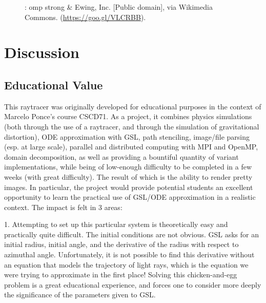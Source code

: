 \begin{figure}[h]
\begin{minipage}{0.45\linewidth}
  \caption{: omp strong \&
    Ewing, Inc. [Public domain], via Wikimedia
    Commons. (\url{https://goo.gl/VLCRBB}).}
    \label{fig:omp_strong}
    \end{minipage}
\end{figure}





\section{Discussion}
\label{sec:disc}

\subsection {Educational Value}


This raytracer was originally developed for educational purposes in the context of Marcelo Ponce's course CSCD71. As a project, it combines physics simulations (both through the use of a raytracer, and through the simulation of gravitational distortion), ODE approximation with GSL, path stenciling, image/file parsing (esp. at large scale), parallel and distributed computing with MPI and OpenMP, domain decomposition, as well as providing a bountiful quantity of variant implementations, while being of low-enough difficulty to be completed in a few weeks (with great difficulty). The result of which is the ability to render pretty images. In particular, the project would provide potential students an excellent opportunity to learn the practical use of GSL/ODE approximation in a realistic context. The impact is felt in 3 areas:

1. Attempting to set up this particular system is theoretically easy and practically quite difficult. The initial conditions are not obvious. GSL asks for an initial radius, initial angle, and the derivative of the radius with respect to azimuthal angle. Unfortunately, it is not possible to find this derivative without an equation that models the trajectory of light rays, which is the equation we were trying to approximate in the first place! Solving this chicken-and-egg problem is a great educational experience, and forces one to consider more deeply the significance of the parameters given to GSL. 

